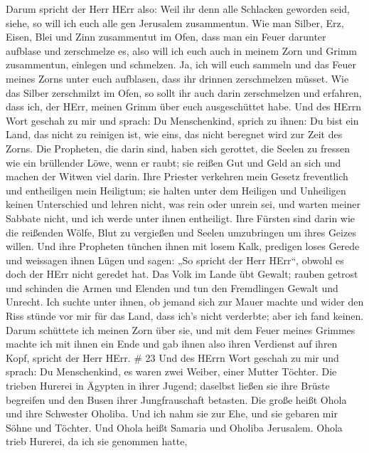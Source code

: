 Darum spricht der Herr HErr also: Weil ihr denn alle Schlacken geworden
seid, siehe, so will ich euch alle gen Jerusalem zusammentun.
 Wie man Silber, Erz, Eisen, Blei und Zinn zusammentut im
Ofen, dass man ein Feuer darunter aufblase und zerschmelze es, also will
ich euch auch in meinem Zorn und Grimm zusammentun, einlegen und
schmelzen.  Ja, ich will euch sammeln und das Feuer meines
Zorns unter euch aufblasen, dass ihr drinnen zerschmelzen müsset.
 Wie das Silber zerschmilzt im Ofen, so sollt ihr auch
darin zerschmelzen und erfahren, dass ich, der HErr, meinen Grimm über
euch ausgeschüttet habe.  Und des HErrn Wort geschah zu mir
und sprach:  Du Menschenkind, sprich zu ihnen: Du bist ein
Land, das nicht zu reinigen ist, wie eins, das nicht beregnet wird zur
Zeit des Zorns.  Die Propheten, die darin sind, haben sich
gerottet, die Seelen zu fressen wie ein brüllender Löwe, wenn er raubt;
sie reißen Gut und Geld an sich und machen der Witwen viel darin.
 Ihre Priester verkehren mein Gesetz freventlich und
entheiligen mein Heiligtum; sie halten unter dem Heiligen und Unheiligen
keinen Unterschied und lehren nicht, was rein oder unrein sei, und
warten meiner Sabbate nicht, und ich werde unter ihnen entheiligt.
 Ihre Fürsten sind darin wie die reißenden Wölfe, Blut zu
vergießen und Seelen umzubringen um ihres Geizes willen. 
Und ihre Propheten tünchen ihnen mit losem Kalk, predigen loses Gerede
und weissagen ihnen Lügen und sagen: „So spricht der Herr HErr``, obwohl
es doch der HErr nicht geredet hat.  Das Volk im Lande übt
Gewalt; rauben getrost und schinden die Armen und Elenden und tun den
Fremdlingen Gewalt und Unrecht.  Ich suchte unter ihnen, ob
jemand sich zur Mauer machte und wider den Riss stünde vor mir für das
Land, dass ich's nicht verderbte; aber ich fand keinen. 
Darum schüttete ich meinen Zorn über sie, und mit dem Feuer meines
Grimmes machte ich mit ihnen ein Ende und gab ihnen also ihren Verdienst
auf ihren Kopf, spricht der Herr HErr. \# 23  Und des HErrn
Wort geschah zu mir und sprach:  Du Menschenkind, es waren
zwei Weiber, einer Mutter Töchter.  Die trieben Hurerei in
Ägypten in ihrer Jugend; daselbst ließen sie ihre Brüste begreifen und
den Busen ihrer Jungfrauschaft betasten.  Die große heißt
Ohola und ihre Schwester Oholiba. Und ich nahm sie zur Ehe, und sie
gebaren mir Söhne und Töchter. Und Ohola heißt Samaria und Oholiba
Jerusalem.  Ohola trieb Hurerei, da ich sie genommen hatte,
